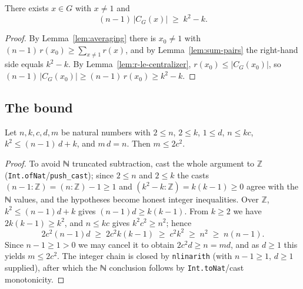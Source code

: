 \begin{lemma}
    \label{lem:big-centralizer}
    \leanok
    There exists $x \in G$ with $x \ne 1$ and
    \[
        (n - 1)\, |C_G(x)| \;\ge\; k^2 - k .
    \]
\end{lemma}
\begin{proof}
    By Lemma~\ref{lem:averaging} there is $x_0 \ne 1$ with
    $(n-1)\, r(x_0) \ge \sum_{x \ne 1} r(x)$, and by Lemma~\ref{lem:sum-pairs}
    the right-hand side equals $k^2 - k$. By Lemma~\ref{lem:r-le-centralizer},
    $r(x_0) \le |C_G(x_0)|$, so
    $(n-1)\,|C_G(x_0)| \ge (n-1)\, r(x_0) \ge k^2 - k$.
\end{proof}

\subsection{The bound}

\begin{lemma}
    \label{lem:index-arith}
    \leanok
    Let $n, k, c, d, m$ be natural numbers with $2 \le n$, $2 \le k$,
    $1 \le d$, $n \le k c$, $k^2 \le (n-1)\, d + k$, and $m\, d = n$. Then
    $m \le 2 c^2$.
\end{lemma}
\begin{proof}
    To avoid ℕ truncated subtraction, cast the whole argument to $\mathbb{Z}$
    (\texttt{Int.ofNat}/\texttt{push\_cast}); since $2 \le n$ and $2 \le k$ the
    casts $(n-1 : \mathbb{Z}) = (n : \mathbb{Z}) - 1 \ge 1$ and
    $(k^2 - k : \mathbb{Z}) = k(k-1) \ge 0$ agree with the ℕ values, and the
    hypotheses become honest integer inequalities. Over $\mathbb{Z}$,
    $k^2 \le (n-1)d + k$ gives $(n-1)d \ge k(k-1)$. From $k \ge 2$ we have
    $2k(k-1) \ge k^2$, and $n \le kc$ gives $k^2 c^2 \ge n^2$; hence
    \[
        2 c^2 (n-1) d \;\ge\; 2 c^2 k(k-1) \;\ge\; c^2 k^2 \;\ge\; n^2 \;\ge\; n(n-1).
    \]
    Since $n - 1 \ge 1 > 0$ we may cancel it to obtain $2 c^2 d \ge n = m d$, and
    as $d \ge 1$ this yields $m \le 2 c^2$. The integer chain is closed by
    \texttt{nlinarith} (with $n - 1 \ge 1$, $d \ge 1$ supplied), after which the
    ℕ conclusion follows by \texttt{Int.toNat}/cast monotonicity.
\end{proof}

